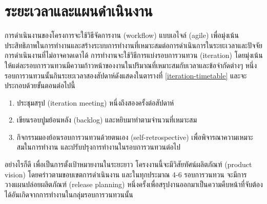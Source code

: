 \section{ระยะเวลาและแผนดําเนินงาน}
การดำเนินงานของโครงการจะใช้วิธีจัดการงาน (workflow) แบบเอไจล์ (agile) เพื่อมุ่งเน้นประสิทธิภาพในการทำงานและสร้างระบบการทำงานที่เหมาะสมต่อการดำเนินการในระยะเวลาและปัจจัยการดำเนินงานที่ไม่อาจคาดเดาได้
การทำงานจะใช้วิธีการแบ่งรอบการวนทวน (iteration) โดยมุ่งเน้นให้แต่ละรอบการวนทวนมีความก้าวหน้าของงานในปริมาณที่เหมาะสมกับเวลาและข้อจำกัดต่างๆ
หนึ่งรอบการวนทวนนั้นกินระยะเวลาสองสัปดาห์ดังแสดงในตารางที่ \ref{iteration-timetable} และจะประกอบด้วยขั้นตอนต่อไปนี้
\begin{enumerate}
    \item ประชุมสรุป (iteration meeting) หนึ่งถึงสองครั้งต่อสัปดาห์
    \item เขียนรอบปูมย้อนหลัง (backlog) และหยิบมาทำตามจำนวนที่เหมาะสม
    \item กิจกรรมมองย้อนรอบการวนทวนด้วยตนเอง (self-retrospective) เพื่อพิจารณาความเหมาะสมในการทำงาน และปรับปรุงการทำงานในรอบการวนทวนต่อไป
\end{enumerate}
อย่างไรก็ดี เพื่อเป็นการตั้งเป้าหมายงานในระยะยาว โครงงานนี้จะมีวิสัยทัศน์ผลิตภัณฑ์ (product vision) โดยคร่าวตามขอบเขตการดำเนินงาน และในทุกประมาณ 4-6 รอบการวนทวน จะมีการวางแผนปล่อยผลิตภัณฑ์ (release planning) หนึ่งครั้งเพื่อสรุปงานออกมาเป็นความคืบหน้าที่จับต้องได้อันเกิดจากการทำงานในกลุ่มรอบการวนทวนนั้น

